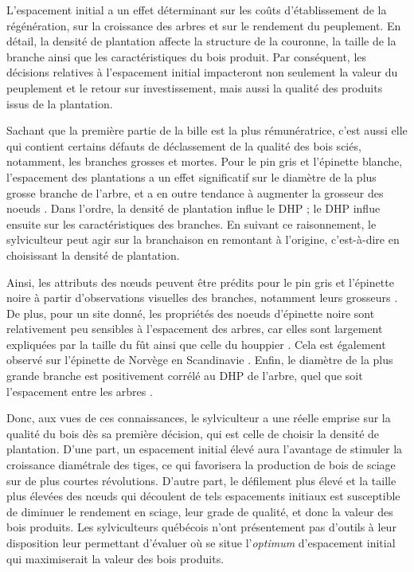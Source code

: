\documentclass[letterpaper, 12pt]{article}
\begin{document}
\begin{onehalfspace}
L'espacement initial a un effet déterminant sur les coûts d'établissement de la régénération, sur la croissance des arbres et sur le rendement du peuplement. En détail, la densité de plantation affecte la structure de la couronne, la taille de la branche ainsi que les caractéristiques du bois produit. Par conséquent, les décisions relatives à l'espacement initial impacteront non seulement la valeur du peuplement et le retour sur investissement, mais aussi la qualité des produits issus de la plantation.

\vspace{12pt}

Sachant que la première partie de la bille est la plus rémunératrice, c'est aussi elle qui contient certains défauts de déclassement de la qualité des bois sciés, notamment, les branches grosses et mortes. Pour le pin gris et l'épinette blanche, l'espacement des plantations a un effet significatif sur le diamètre de la plus grosse branche de l'arbre, et a en outre tendance à augmenter la grosseur des noeuds \cite{Hebert2016, Tong2013}. Dans l'ordre, la densité de plantation influe le DHP ; le DHP influe ensuite sur les caractéristiques des branches. En suivant ce raisonnement, le sylviculteur peut agir sur la branchaison en remontant à l'origine, c'est-à-dire en choisissant la densité de plantation.

\vspace{12pt}

Ainsi, les attributs des nœuds peuvent être prédits pour le pin gris et l’épinette noire à partir d'observations visuelles des branches, notamment leurs grosseurs \cite{Duchateau2013}. De plus, pour un site donné, les propriétés des noeuds d'épinette noire  sont relativement peu sensibles à l'espacement des arbres, car elles sont largement expliquées par la taille du fût ainsi que celle du houppier \cite{Benjamin2009, Zhang2005}. Cela est également observé sur l'épinette de Norvège en Scandinavie \cite{Johansson1992, Makinen1999, Pfister2007}. Enfin, le diamètre de la plus grande branche est positivement corrélé au DHP de l'arbre, quel que soit l'espacement entre les arbres \cite{Hebert2016, Tong2005}. 

\vspace{12pt}
 
Donc, aux vues de ces connaissances, le sylviculteur a une réelle emprise sur la qualité du bois dès sa première décision, qui est celle de choisir la densité de plantation. D'une part, un espacement initial élevé aura l'avantage de stimuler la croissance diamétrale des tiges, ce qui favorisera la production de bois de sciage sur de plus courtes révolutions. D'autre part, le défilement plus élevé et la taille plus élevées des nœuds qui découlent de tels espacements initiaux est susceptible de diminuer le rendement en sciage, leur grade de qualité, et donc la valeur des bois produits. Les sylviculteurs québécois n'ont présentement pas d'outils à leur disposition leur permettant d'évaluer où se situe l'\textit{optimum} d'espacement initial qui maximiserait la valeur des bois produits.


\end{onehalfspace}
\end{document}
